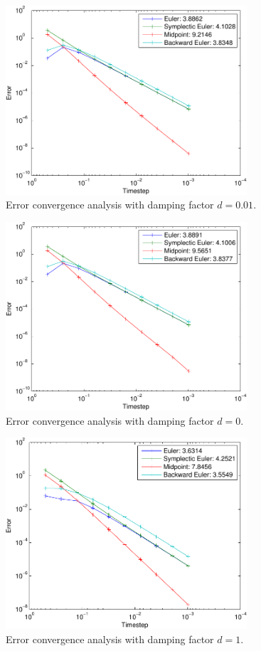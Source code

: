 \begin{figure}
	\centering
		\includegraphics*[width=0.8\textwidth]{../data/ex1/errorConvergenceDamp0_01-crop.pdf}
	\caption{Error convergence analysis with damping factor $d=0.01$.}
	\label{fig:errorconvd001} 
\end{figure}
\begin{figure}
	\centering
		\includegraphics*[width=0.8\textwidth]{../data/ex1/errorConvergenceDamp0-crop.pdf}
	\caption{Error convergence analysis with damping factor $d=0$.}
	\label{fig:errorconvd0} 
\end{figure}
\begin{figure}
	\centering
		\includegraphics*[width=0.8\textwidth]{../data/ex1/errorConvergenceDamp1-crop.pdf}
	\caption{Error convergence analysis with damping factor $d=1$.}
	\label{fig:errorconvd1} 
\end{figure}

